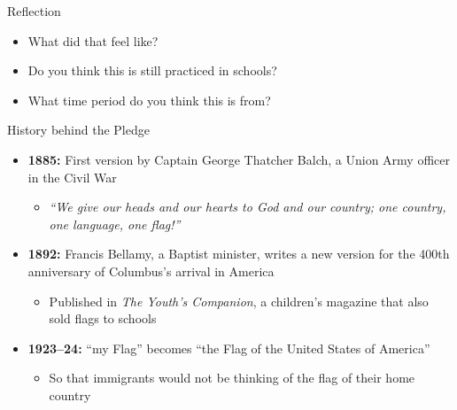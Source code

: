 \documentclass[aspectratio=169,11pt]{beamer}
\begin{document}
\begin{frame}{Reflection}
  \begin{itemize}\setlength{\itemsep}{1.2em}
    \item What did that feel like?
    \item Do you think this is still practiced in schools?
    \item What time period do you think this is from?
  \end{itemize}
\end{frame}

\begin{frame}{History behind the Pledge}
  \begin{itemize}\setlength{\itemsep}{0.6em}
    \item \textbf{1885:} First version by Captain George Thatcher Balch, a Union Army officer in the Civil War
      \begin{itemize}
        \item \emph{``We give our heads and our hearts to God and our country; one country, one language, one flag!''}
      \end{itemize}
    \item \textbf{1892:} Francis Bellamy, a Baptist minister, writes a new version for the 400th anniversary of Columbus's arrival in America
      \begin{itemize}
        \item Published in \emph{The Youth's Companion}, a children's magazine that also sold flags to schools
      \end{itemize}
    \item \textbf{1923--24:} ``my Flag'' becomes ``the Flag of the United States of America''
      \begin{itemize}
        \item So that immigrants would not be thinking of the flag of their home country
      \end{itemize}
  \end{itemize}
\end{frame}
\end{document}
